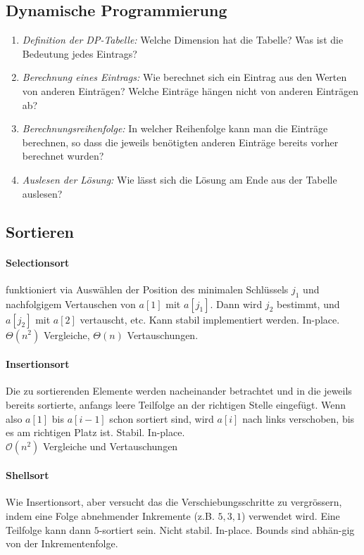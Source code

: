 \documentclass[a4paper, 9pt, DIV=20]{scrartcl}
\newcommand{\Oh}{\mathcal{O}}
\newcommand{\Th}{\Theta}
\begin{document}
\subsection{Dynamische Programmierung}
\begin{enumerate}
\item \emph{Definition der DP-Tabelle:} Welche Dimension hat die Tabelle? Was ist die Bedeutung jedes Eintrags?
\item \emph{Berechnung eines Eintrags:} Wie berechnet sich ein Eintrag aus den Werten von anderen Einträgen? Welche Einträge hängen nicht von anderen Einträgen ab?
\item \emph{Berechnungsreihenfolge:} In welcher Reihenfolge kann man die Einträge berechnen, so dass die jeweils benötigten anderen Einträge bereits vorher berechnet wurden?
\item \emph{Auslesen der Lösung:} Wie lässt sich die Lösung am Ende aus der Tabelle auslesen?
\end{enumerate}

\subsection{Sortieren}
\paragraph{Selectionsort} funktioniert via Auswählen der Position des minimalen Schlüssels $j_{1}$ und nachfolgigem Vertauschen von $a[1]$ mit $a[j_{1}]$. Dann wird $j_{2}$ bestimmt, und $a[j_{2}]$ mit $a[2]$ vertauscht, etc. Kann stabil implementiert werden. In-place.\\
$\Th(n^{2})$ Vergleiche, $\Th(n)$ Vertauschungen.

\paragraph{Insertionsort} Die zu sortierenden Elemente werden nacheinander betrachtet und in die jeweils bereits sortierte, anfangs leere Teilfolge an der richtigen Stelle eingefügt. Wenn also $a[1]$ bis $a[i-1]$ schon sortiert sind, wird $a[i]$ nach links verschoben, bis es am richtigen Platz ist. Stabil. In-place.\\
$\Oh(n^{2})$ Vergleiche und Vertauschungen

\paragraph{Shellsort} Wie Insertionsort, aber versucht das die Verschiebungsschritte zu vergrössern, indem eine Folge abnehmender Inkremente (z.B. $5,3,1$) verwendet wird. Eine Teilfolge kann dann $5$-sortiert sein. Nicht stabil. In-place. Bounds sind abhän-gig von der Inkrementenfolge.
\end{document}
